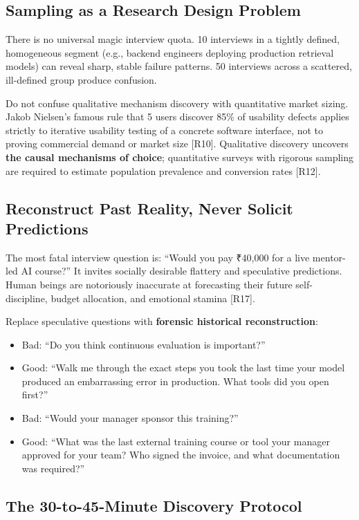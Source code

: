 \subsection{Sampling as a Research Design Problem}

There is no universal magic interview quota. 10 interviews in a tightly defined, homogeneous segment (e.g., backend engineers deploying production retrieval models) can reveal sharp, stable failure patterns. 50 interviews across a scattered, ill-defined group produce confusion.

Do not confuse qualitative mechanism discovery with quantitative market sizing. Jakob Nielsen's famous rule that 5 users discover 85\% of usability defects applies strictly to iterative usability testing of a concrete software interface, not to proving commercial demand or market size [R10]. Qualitative discovery uncovers \textbf{the causal mechanisms of choice}; quantitative surveys with rigorous sampling are required to estimate population prevalence and conversion rates [R12].

\subsection{Reconstruct Past Reality, Never Solicit Predictions}

The most fatal interview question is: ``Would you pay ₹40,000 for a live mentor-led AI course?'' It invites socially desirable flattery and speculative predictions. Human beings are notoriously inaccurate at forecasting their future self-discipline, budget allocation, and emotional stamina [R17].

Replace speculative questions with \textbf{forensic historical reconstruction}:
\begin{itemize}[leftmargin=1.2em,itemsep=0.2ex]
  \item Bad: ``Do you think continuous evaluation is important?''
  \item Good: ``Walk me through the exact steps you took the last time your model produced an embarrassing error in production. What tools did you open first?''
  \item Bad: ``Would your manager sponsor this training?''
  \item Good: ``What was the last external training course or tool your manager approved for your team? Who signed the invoice, and what documentation was required?''
\end{itemize}

\subsection{The 30-to-45-Minute Discovery Protocol}


